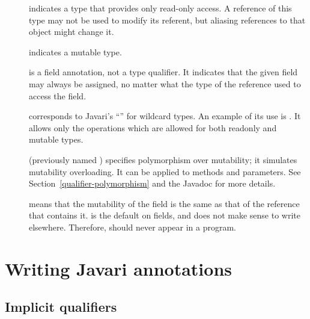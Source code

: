 \begin{description}

\item[]
  indicates a type that provides only read-only access.  A reference of
  this type may not be used to modify its referent, but aliasing references
  to that object might change it.

\item[]
  indicates a mutable type.
  
\item[]
  is a field annotation, not a type qualifier.  It indicates that the given
  field may always be assigned, no matter what the type of the reference
  used to access the field.
  
\item[]
  corresponds to Javari's ``'' for wildcard types.  An
  example of its use is .  It allows only the
  operations which are allowed for both readonly and mutable types.

\item[]
  (previously named ) specifies polymorphism over
  mutability; it simulates mutability overloading.  It can be applied to
  methods and parameters.  See Section~\ref{qualifier-polymorphism} and the
   Javadoc for more details.

\item[]
  means that the mutability of the field is the same as that of the
  reference that contains it.   is the default on
  fields, and does not make sense to write elsewhere.  Therefore,
   should never appear in a program.

\end{description}


\section{Writing Javari annotations\label{writing-javari-annotations}}


\subsection{Implicit qualifiers\label{javari-implicit-qualifiers}}

